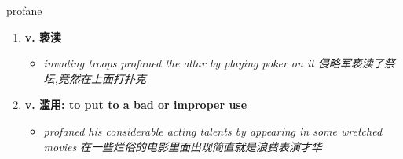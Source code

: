 
\begin{frame}
{\huge profane}
\begin{center}
\begin{enumerate}\Large
  \item \textbf{v. 亵渎}
  \begin{itemize}
    \item \em{\Large{invading troops profaned the altar by playing poker on it 侵略军亵渎了祭坛,竟然在上面打扑克}}
  \end{itemize}
  \item \textbf{v. 滥用: to put to a bad or improper use}
  \begin{itemize}
    \item \em{\Large{profaned his considerable acting talents by appearing in some wretched movies 在一些烂俗的电影里面出现简直就是浪费表演才华}}
  \end{itemize}
\end{enumerate}
\end{center}
\end{frame}
